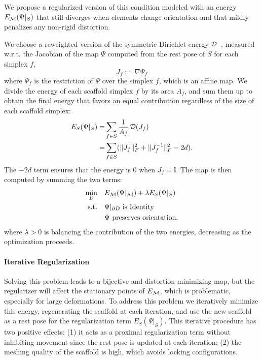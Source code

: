  We propose a regularized version of this condition modeled with an energy $E_{\operatorname{\mathcal{M}}} (\Psi|_{S})$ that still diverges when elements change orientation and that mildly penalizes any non-rigid distortion.
 
 We choose a reweighted version of the symmetric Dirichlet energy $\operatorname{\mathcal{D}}$~\cite{Smith:2015}, measured w.r.t. the Jacobian of the map $\Psi$ computed from the rest pose of $S$ for each simplex $f$,
\begin{equation}
    J_f := \nabla \Psi_f
\end{equation}
where $\Psi_f$ is the restriction of $\Psi$ over the simplex $f$, which is an affine map. We divide the energy of each scaffold simplex $f$ by its area $A_f$, and sum them up to obtain the final energy that favors an equal contribution regardless of the size of each scaffold simplex:
\begin{align}
    \begin{split}
    E_S(\Psi|_{S}) =&\sum_{f\in S} \frac{1}{A_f} \operatorname{\mathcal{D}}(J_f) \\
    =&\sum_{f\in S} (\lVert J_f \rVert_F^2 + \lVert J^{-1}_f \rVert_F^2 -2d).
    \end{split}
\end{align}
The $-2d$ term ensures that the energy is 0 when $J_f = \mathbb{I}$. The map is then computed by summing the two terms:
\begin{align}
\begin{split}\label{eq:variational}
\min_{D} & \quad E_{\operatorname{\mathcal{M}}}(\Psi|_{\operatorname{\mathcal{M}}}) + \lambda E_{S} (\Psi|_{S}) \\
    \text{s.t.} & \quad \Psi|_{\partial D} \text{ is Identity} \\ 
    & \quad \Psi \text{ preserves orientation}.
\end{split}
\end{align}
where $\lambda > 0$ is balancing the contribution of the two energies, decreasing as the optimization proceeds.

\paragraph{Iterative Regularization}
Solving this problem leads to a bijective and distortion minimizing map, but the regularizer will affect the stationary points of $E_{\operatorname{\mathcal{M}}}$, which is problematic, especially for large deformations.
%
To address this problem we iteratively minimize this energy, regenerating the scaffold at each iteration, and use the new scaffold as a rest pose for the regularization term $E_{S} (\Psi|_{S})$. This iterative procedure has two positive effects: (1) it acts as a proximal regularization term without inhibiting movement since the rest pose is updated at each iteration; (2) the meshing quality of the scaffold is high, which avoids locking configurations.

